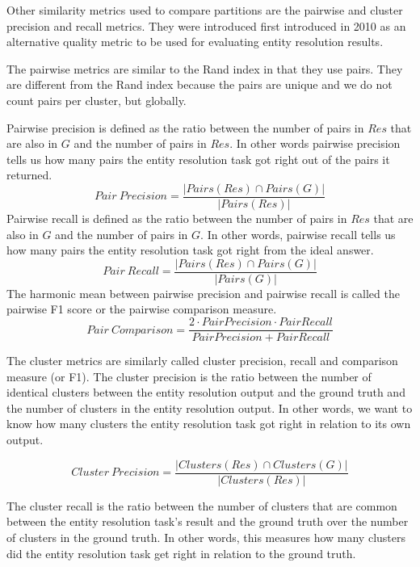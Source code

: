 \documentclass[11pt]{article}
\begin{document}
    Other similarity metrics used to compare partitions are the pairwise and
    cluster precision and recall metrics.
    They were introduced first introduced in 2010 as an alternative quality
    metric to be used for evaluating entity resolution results\cite{Men10}.

    The pairwise metrics are similar to the Rand index in that they use pairs.
    They are different from the Rand index because the pairs are unique and we
    do not count pairs per cluster, but globally.
    
    Pairwise precision is defined as the ratio between the number of pairs in
    $Res$ that are also in $G$ and the number of pairs in $Res$.
    In other words pairwise precision tells us how many pairs the entity
    resolution task got right out of the pairs it returned.
    \[
        Pair~Precision = \frac{|Pairs(Res) \cap Pairs(G)|}{|Pairs(Res)|}
    \]
    Pairwise recall is defined as the ratio between the number of pairs in
    $Res$ that are also in $G$ and the number of pairs in $G$.
    In other words, pairwise recall tells us how many pairs the entity
    resolution task got right from the ideal answer.
    \[
        Pair~Recall = \frac{|Pairs(Res) \cap Pairs(G)|}{|Pairs(G)|}
    \]
    The harmonic mean between pairwise precision and pairwise recall is called
    the pairwise F1 score or the pairwise comparison measure\cite{Men10}.
    \[
        Pair~Comparison = \frac{
            2 \cdot Pair Precision \cdot Pair Recall
        }{Pair Precision + Pair Recall}
    \]

    The cluster metrics are similarly called cluster precision, recall and
    comparison measure (or F1).
    The cluster precision is the ratio between the number of identical clusters
    between the entity resolution output and the ground truth and the number of
    clusters in the entity resolution output.
    In other words, we want to know how many clusters the entity resolution task
    got right in relation to its own output.

    \[
        Cluster~Precision = \frac{|Clusters(Res) \cap Clusters(G)|}{
            |Clusters(Res)|
        }
    \]

    The cluster recall is the ratio between the number of clusters that are
    common between the entity resolution task's result and the ground truth over
    the number of clusters in the ground truth.
    In other words, this measures how many clusters did the entity resolution
    task get right in relation to the ground truth.
\end{document}
